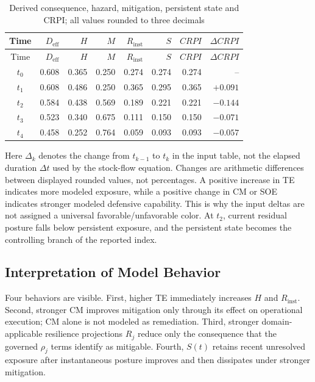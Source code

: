 \documentclass[11pt]{article}
\begin{document}
\begingroup
\small
\setlength{\tabcolsep}{4pt}
\renewcommand{\arraystretch}{1.10}
\begin{longtable}{c r r r r r r r}
\caption{Derived consequence, hazard, mitigation, persistent state and CRPI; all values rounded to three decimals}
\label{tab:worked-timeseries}\\
\toprule
Time & $D_{\mathrm{eff}}$ & $H$ & $M$ & $R_{\mathrm{inst}}$ & $S$ & $CRPI$ & $\Delta CRPI$ \\
\midrule
\endfirsthead
\toprule
Time & $D_{\mathrm{eff}}$ & $H$ & $M$ & $R_{\mathrm{inst}}$ & $S$ & $CRPI$ & $\Delta CRPI$ \\
\midrule
\endhead
$t_0$ & 0.608 & 0.365 & 0.250 & 0.274 & 0.274 & 0.274 & -- \\
$t_1$ & 0.608 & 0.486 & 0.250 & 0.365 & 0.295 & 0.365 & $+0.091$ \\
$t_2$ & 0.584 & 0.438 & 0.569 & 0.189 & 0.221 & 0.221 & $-0.144$ \\
$t_3$ & 0.523 & 0.340 & 0.675 & 0.111 & 0.150 & 0.150 & $-0.071$ \\
$t_4$ & 0.458 & 0.252 & 0.764 & 0.059 & 0.093 & 0.093 & $-0.057$ \\
\bottomrule
\end{longtable}
\endgroup

Here $\Delta_k$ denotes the change from $t_{k-1}$ to $t_k$ in the input table, not the elapsed duration $\Delta t$ used by the stock-flow equation. Changes are arithmetic differences between displayed rounded values,
not percentages. A positive increase in TE indicates more modeled
exposure, while a positive change in CM or SOE indicates stronger
modeled defensive capability. This is why the input deltas are not
assigned a universal favorable/unfavorable color. At $t_2$, current
residual posture falls below persistent exposure, and the persistent
state becomes the controlling branch of the reported index.

\subsection{Interpretation of Model Behavior}
Four behaviors are visible. First, higher TE immediately increases $H$ and
$R_{\mathrm{inst}}$. Second, stronger CM improves mitigation only through its effect on
operational execution; CM alone is not modeled as remediation. Third, stronger
domain-applicable resilience projections $R_j$ reduce only the consequence that the
governed $\rho_j$ terms identify as mitigable.
Fourth, $S(t)$ retains recent unresolved exposure after instantaneous posture improves
and then dissipates under stronger mitigation.
\end{document}
